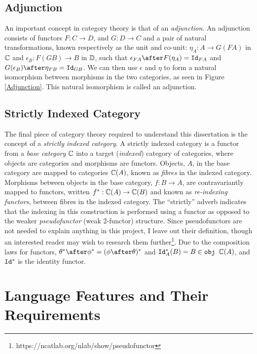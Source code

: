 \documentclass{Report}
\begin{document}
\subsection{Adjunction}\label{WhatsAnAdjunction}
An important concept in category theory is that of an \textit{adjunction}. An adjunction consists of functors $F: C\rightarrow D$, and  $G: D\rightarrow C$ and a pair of natural transformations, known respectively as the unit and co-unit: $\eta_A: A \rightarrow G(F A)$ in $\mathbb{C}$ and $\epsilon_B: F(G B) \rightarrow B$ in $\mathbb{D}$, such that $\epsilon_{F A}\after F(\eta_A) = \Id{F A}$ and $G(\epsilon_B)\after \eta_{F B} = \Id{G B}$. We can then use $\epsilon$ and $\eta$ to form a natural isomorphism between morphisms in the two categories, as seen in Figure \ref{Adjunction}. This natural isomorphism is called an adjunction.


\subsection{Strictly Indexed Category}\label{IndexedCategoryDefinition}

The final piece of category theory required to understand this dissertation is the concept of a \textit{strictly indexed category}. A strictly indexed category is a functor from a \textit{base category} $\mathbb{C}$ into a target (\textit{indexed}) category of categories, where objects are categories and morphisms are functors. Objects, $A$, in the base category are mapped to categories $\mathbb{C}(A)$, known as \textit{fibres} in the indexed category. Morphisms between objects in the base category, $f: B\rightarrow A$, are contravariantly mapped to functors, written $f^*: \mathbb{C}(A)\rightarrow \mathbb{C}(B)$ and known as \textit{re-indexing functors}, between fibres in the indexed category. The ``strictly'' adverb indicates that the indexing in this construction is performed using a functor as opposed to the weaker \textit{pseudofunctor} (weak 2-functor) structure. Since pseudofunctors are not needed to explain anything in this project, I leave out their definition, though an interested reader may wish to research them further\footnote{https://ncatlab.org/nlab/show/pseudofunctor}.  Due to the composition laws for functors, $\theta\star\after\phi\star = (\phi\after\theta)\star$ and $\texttt{Id}_{A}^*(B) = B\in\texttt{obj } \mathbb{C}(A)$, and $\texttt{Id}_{}^*$ is the identity functor.
\section{Language Features and Their Requirements}\label{LanguageFeatureRequirements}
\end{document}
